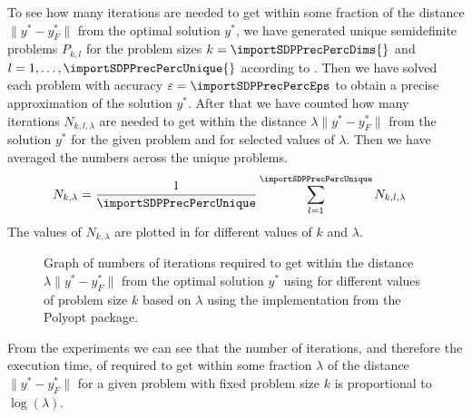 To see how many iterations are needed to get within some fraction of the distance $\|y^* - y_F^*\|$ from the optimal solution $y^*$, we have generated unique semidefinite problems $P_{k, l}$ for the problem sizes $k = \importSDPPrecPercDims{}$ and $l = 1, \ldots, \importSDPPrecPercUnique{}$ according to .
Then we have solved each problem with accuracy $\varepsilon = \importSDPPrecPercEps$ to obtain a precise approximation of the solution $y^*$.
After that we have counted how many iterations $N_{k,l,\lambda}$ are needed to get within the distance $\lambda \|y^* - y_F^*\|$ from the solution $y^*$ for the given problem and for selected values of $\lambda$.
Then we have averaged the numbers across the unique problems.
\begin{align}
  N_{k,\lambda} &= \frac{1}{\importSDPPrecPercUnique}\sum_{l=1}^{\importSDPPrecPercUnique}N_{k,l,\lambda}
\end{align}
The values of $N_{k,\lambda}$ are plotted in  for different values of $k$ and $\lambda$.

\begin{figure}[ht]
  \centering
  \resizebox{0.95\textwidth}{!}{}
  \caption{Graph of numbers of iterations required to get within the distance $\lambda \|y^* - y_F^*\|$ from the optimal solution $y^*$ using  for different values of problem size $k$ based on $\lambda$ using the implementation from the Polyopt package.}
\end{figure}

From the experiments we can see that the number of iterations, and therefore the execution time, of  required to get within some fraction $\lambda$ of the distance $\|y^* - y_F^*\|$ for a given problem with fixed problem size $k$ is proportional to $\log(\lambda)$.
